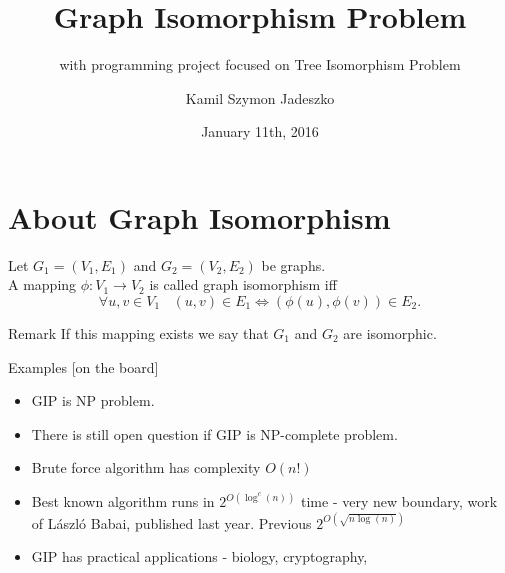 \documentclass{beamer}
\title{Graph Isomorphism Problem}
\subtitle{with programming project focused on Tree Isomorphism Problem}
\author{Kamil Szymon Jadeszko}
\institute{HS Mittweida \\ Network Algorithms Course}
\date{January 11th, 2016}
\begin{document}
\begin{frame}
  \titlepage
\end{frame}


\section{About Graph Isomorphism}

\begin{frame}

\begin{definition}
Let $G_1 = (V_1, E_1)$ and $G_2 = (V_2, E_2)$ be graphs.  \\
	A mapping $\phi : V_1 \rightarrow V_2$ is called \alert{graph isomorphism} iff $$\forall u,v \in V_1 ~~~~ (u,v) \in E_1 \iff (\phi(u),\phi(v)) \in E_2 . $$
\end{definition}

\begin{block}{Remark}
If this mapping exists we say that \alert{ $G_1$ and $G_2$ are isomorphic}.  
\end{block}
\end{frame}

\begin{frame}

\begin{block}{Examples}
[on the board]
\end{block}

\end{frame}


\begin{frame}

\begin{itemize}
\item GIP is NP problem. 
\pause
\item There is still open question if GIP is NP-complete problem. 
\pause
\item Brute force algorithm has complexity $O(n!)$
\pause
\item Best known algorithm runs in $2^{O(\log^c(n))}$ time - very new boundary, work of László Babai, published last year. Previous $2^{O(\sqrt{n\log(n)})}$
\pause
\item GIP has practical applications - biology, cryptography, 
\end{itemize}

\end{frame}
\end{document}

